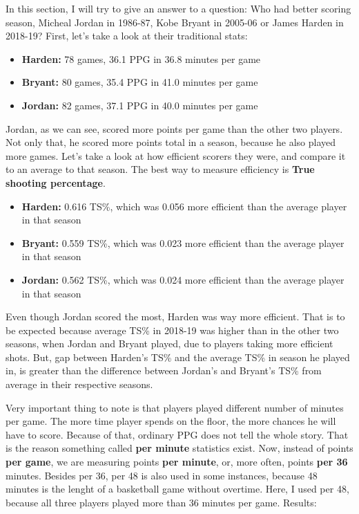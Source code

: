 \documentclass[a4paper]{article}
\begin{document}
In this section, I will try to give an answer to a question: Who had better scoring season, Micheal Jordan in 1986-87, Kobe Bryant in 2005-06 or James Harden in 2018-19? First, let's take a look at their traditional stats:

\begin{itemize}
	\item \textbf{Harden:} 78 games, 36.1 PPG in 36.8 minutes per game
	\item \textbf{Bryant:} 80 games, 35.4 PPG in 41.0 minutes per game
	\item \textbf{Jordan:} 82 games, 37.1 PPG in 40.0 minutes per game
\end{itemize}

Jordan, as we can see, scored more points per game than the other two players. Not only that, he scored more points total in a season, because he also played more games. Let's take a look at how efficient scorers they were, and compare it to an average to that season. The best way to measure efficiency is \textbf{True shooting percentage}.

\begin{itemize}
	\item \textbf{Harden:} 0.616 TS\%, which was 0.056 more efficient than the average player in that season
	\item \textbf{Bryant:} 0.559 TS\%, which was 0.023 more efficient than the average player in that season
	\item \textbf{Jordan:} 0.562 TS\%, which was 0.024 more efficient than the average player in that season
\end{itemize}

Even though Jordan scored the most, Harden was way more efficient. That is to be expected because average TS\% in 2018-19 was higher than in the other two seasons, when Jordan and Bryant played, due to players taking more efficient shots. But, gap between Harden's TS\% and the average TS\% in season he played in, is greater than the difference between Jordan's and Bryant's TS\% from average in their respective seasons.

Very important thing to note is that players played different number of minutes per game. The more time player spends on the floor, the more chances he will have to score. Because of that, ordinary PPG does not tell the whole story. That is the reason something called \textbf{per minute} statistics exist. Now, instead of points \textbf{per game}, we are measuring points \textbf{per minute}, or, more often, points \textbf{per 36} minutes. Besides per 36, per 48 is also used in some instances, because 48 minutes is the lenght of a basketball game without overtime. Here, I used per 48, because all three players played more than 36 minutes per game. Results:
\end{document}
